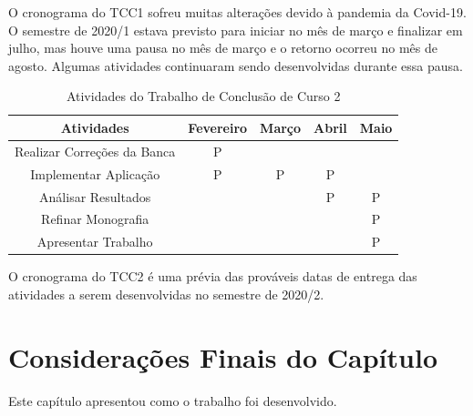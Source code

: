 O cronograma do TCC1 sofreu muitas alterações devido à pandemia da Covid-19. O semestre de 2020/1 estava previsto para iniciar no mês de março e finalizar em julho, mas houve uma pausa no 
mês de março e o retorno ocorreu no mês de agosto. Algumas atividades continuaram sendo desenvolvidas durante essa pausa.



\begin{table}[ht]
	\centering
	\caption{Atividades do Trabalho de Conclusão de Curso 2}
	\label{tab05}
	
	\begin{tabular}{ccccc}
		\toprule
		\textbf{Atividades} & \textbf{Fevereiro} & 
		\textbf{Março}  & \textbf{Abril}& \textbf{Maio}\\
		\midrule
		\begin{minipage} [t] {0.2\textwidth} \centering Realizar Correções da Banca \end{minipage} & P &  &  &  \\
		\midrule
		\begin{minipage} [t] {0.2\textwidth} \centering Implementar Aplicação \end{minipage} & P & P & P &  \\
		\midrule
		\begin{minipage} [t] {0.2\textwidth} \centering Análisar Resultados \end{minipage} &  &  &P &P  \\
		\midrule
		\begin{minipage} [t] {0.2\textwidth} \centering Refinar Monografia \end{minipage} &  &  &  & P \\
		\midrule
		\begin{minipage} [t] {0.2\textwidth} \centering Apresentar Trabalho \end{minipage} &  & & & P \\
		\bottomrule
	\end{tabular}
\end{table}

O cronograma do TCC2 é uma prévia das prováveis datas de entrega das atividades a serem desenvolvidas no semestre de 2020/2.

\section{Considerações Finais do Capítulo}

Este capítulo apresentou como o trabalho foi desenvolvido.

